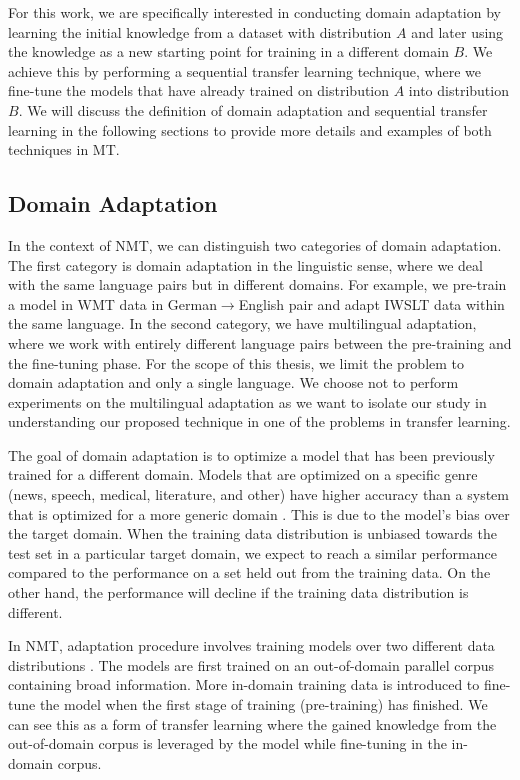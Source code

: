 For this work, we are specifically interested in conducting domain adaptation by learning the initial knowledge from a dataset with distribution $A$ and later using the knowledge as a new starting point for training in a different domain $B$. We achieve this by performing a sequential transfer learning technique, where we fine-tune the models that have already trained on distribution $A$ into distribution $B$. We will discuss the definition of domain adaptation and sequential transfer learning in the following sections to provide more details and examples of both techniques in MT.

\subsection{Domain Adaptation}
\label{sec:domain_adapt}
In the context of NMT, we can distinguish two categories of domain adaptation. The first category is domain adaptation in the linguistic sense, where we deal with the same language pairs but in different domains. For example, we pre-train a model in WMT data in German$\rightarrow$English pair and adapt IWSLT data within the same language. In the second category, we have multilingual adaptation, where we work with entirely different language pairs between the pre-training and the fine-tuning phase. For the scope of this thesis, we limit the problem to domain adaptation and only a single language. We choose not to perform experiments on the multilingual adaptation as we want to isolate our study in understanding our proposed technique in one of the problems in transfer learning.

The goal of domain adaptation is to optimize a model that has been previously trained for a different domain. Models that are optimized on a specific genre (news, speech, medical, literature, and other) have higher accuracy than a system that is optimized for a more generic domain . This is due to the model's bias over the target domain. When the training data distribution is unbiased towards the test set in a particular target domain, we expect to reach a similar performance compared to the performance on a set held out from the training data. On the other hand, the performance will decline if the training data distribution is different.

In NMT, adaptation procedure involves training models over two different data distributions . The models are first trained on an out-of-domain parallel corpus containing broad information. More in-domain training data is introduced to fine-tune the model when the first stage of training (pre-training) has finished. We can see this as a form of transfer learning where the gained knowledge from the out-of-domain corpus is leveraged by the model while fine-tuning in the in-domain corpus.

